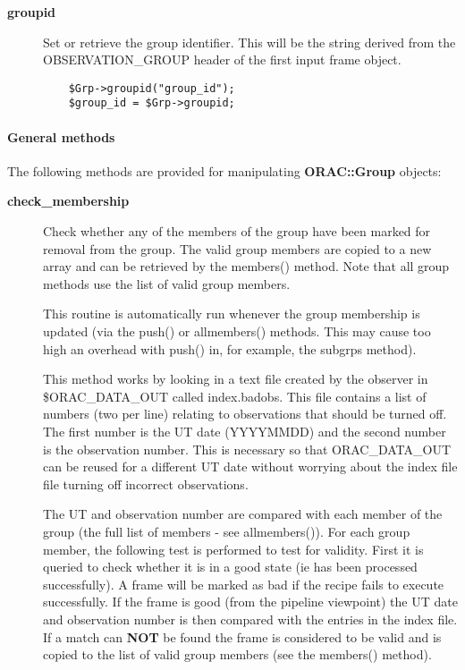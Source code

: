 \begin{description}
\begin{description}
\begin{description}
\item[{\textbf{groupid}}] \mbox{}

Set or retrieve the group identifier. This will
be the string derived from the OBSERVATION\_GROUP
header of the first input frame object.

\begin{verbatim}
    $Grp->groupid("group_id");
    $group_id = $Grp->groupid;
\end{verbatim}
\end{description}
\paragraph*{General methods\label{ORAC::Group_General_methods}}


The following methods are provided for manipulating \textbf{ORAC::Group}
objects:

\begin{description}

\item[{\textbf{check\_membership}}] \mbox{}

Check whether any of the members of the group have been marked for
removal from the group. The valid group members are copied
to a new array and can be retrieved by the members() method.
Note that all group methods use the list of valid group
members.



This routine is automatically run whenever the group membership
is updated (via the push() or  allmembers() methods. This may
cause too high an overhead with push() in, for example, the
subgrps method).



This method works by looking in a text file created by the
observer in \$ORAC\_DATA\_OUT called index.badobs. This file
contains a list of numbers (two per line) relating to observations
that should be turned off. The first number is the UT date
(YYYYMMDD) and the second number is the observation
number. This is necessary so that ORAC\_DATA\_OUT can be reused
for a different UT date without worrying about the index file
file turning off incorrect observations.



The UT and observation number are compared with each member of
the group (the full list of members - see allmembers()).
For each group member, the following test is performed to test
for validity. First it is queried to check whether it is in a
good state (ie has been processed successfully).
A frame will be marked as bad if the recipe fails to execute
successfully. If the frame is good (from the pipeline viewpoint)
the UT date and observation number is then compared with the
entries in the index file. If a match can \textbf{NOT} be found the
frame is considered to be valid and is copied to the list of valid
group members (see the members() method).




\end{description}
\end{description}
\end{description}
